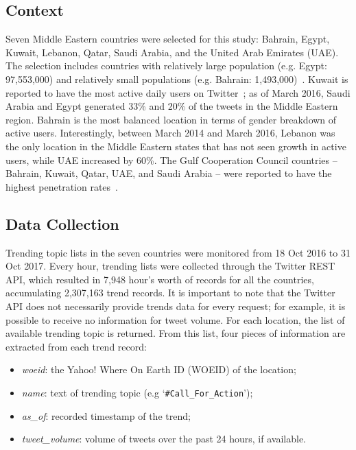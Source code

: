 \documentclass{llncs}
\begin{document}
\subsection{Context}

Seven Middle Eastern countries were selected for this study: Bahrain,
Egypt, Kuwait, Lebanon, Qatar, Saudi Arabia, and the United Arab
Emirates (UAE). The selection includes countries with relatively large
population (e.g. Egypt: 97,553,000) and relatively small populations
(e.g. Bahrain:
1,493,000)~\cite{UnitedNationsDepartmentofEconomicandSocialAffairs2017}. Kuwait
is reported to have the most active daily users on
Twitter~\cite{Salem2017}; as of March 2016, Saudi Arabia and Egypt
generated 33\% and 20\% of the tweets in the Middle Eastern
region. Bahrain is the most balanced location in terms of gender
breakdown of active users. Interestingly, between March 2014 and March
2016, Lebanon was the only location in the Middle Eastern states that
has not seen growth in active users, while UAE increased by 60\%. The
Gulf Cooperation Council countries -- Bahrain, Kuwait, Qatar, UAE, and
Saudi Arabia -- were reported to have the highest penetration
rates~\cite{Salem2017}.

\subsection{Data Collection}

Trending topic lists in the seven countries were monitored from 18 Oct 2016
to 31 Oct 2017. Every hour, trending lists were collected through the 
Twitter REST API, which resulted in 7,948 hour's worth of records for
all the countries, accumulating 2,307,163 trend records. It is important
to note that the Twitter API does not necessarily provide trends data
for every request; for example, it is possible to receive no
information for tweet volume. For each location, the list of available
trending topic is returned. From this list, four pieces of information
are extracted from each trend record:

\begin{itemize}
\item {\emph{woeid}}: the Yahoo! Where On Earth ID (WOEID) of the location;
\item {\emph{name}}: text of trending topic (e.g `{\texttt{\#Call\_For\_Action}}');
\item {\emph{as\_of}}: recorded timestamp of the trend;
\item {\emph{tweet\_volume}}: volume of tweets over the past 24 hours, if available.
\end{itemize}
\end{document}
